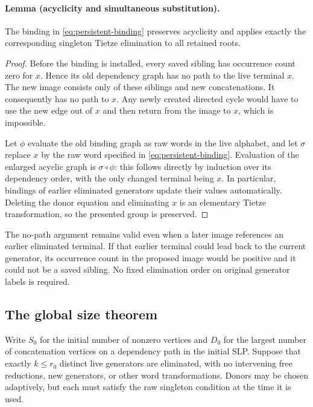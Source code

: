\paragraph{Lemma (acyclicity and simultaneous substitution).}
The binding in \eqref{eq:persistent-binding} preserves acyclicity and
applies exactly the corresponding singleton Tietze elimination to all
retained roots.

\begin{proof}
Before the binding is installed, every saved sibling has occurrence count
zero for $x$. Hence its old dependency graph has no path to the live
terminal $x$. The new image consists only of these siblings and new
concatenations. It consequently has no path to $x$. Any newly created
directed cycle would have to use the new edge out of $x$ and then return
from the image to $x$, which is impossible.

Let $\phi$ evaluate the old binding graph as raw words in the live
alphabet, and let $\sigma$ replace $x$ by the raw word specified in
\eqref{eq:persistent-binding}. Evaluation of the enlarged acyclic graph
is $\sigma\circ\phi$: this follows directly by induction over its
dependency order, with the only changed terminal being $x$. In
particular, bindings of earlier eliminated generators update their values
automatically. Deleting the donor equation and eliminating $x$ is an
elementary Tietze transformation, so the presented group is preserved.
\end{proof}

The no-path argument remains valid even when a later image references an
earlier eliminated terminal. If that earlier terminal could lead back to
the current generator, its occurrence count in the proposed image would
be positive and it could not be a saved sibling. No fixed elimination
order on original generator labels is required.

\subsection{The global size theorem}

Write $S_0$ for the initial number of nonzero vertices and $D_0$ for the
largest number of concatenation vertices on a dependency path in the
initial SLP. Suppose that exactly $k\le r_0$ distinct live generators are
eliminated, with no intervening free reductions, new generators, or other
word transformations. Donors may be chosen adaptively, but each must
satisfy the raw singleton condition at the time it is used.

